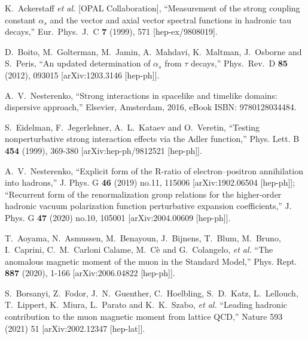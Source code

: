 \documentclass[aps,nofootinbib,showkeys,noshowpacs,preprintnumbers,amsmath,amssymb]{revtex4}
\begin{document}
\begin{thebibliography}{99}
  K.~Ackerstaff {\it et al.} [OPAL Collaboration],
  ``Measurement of the strong coupling constant $\alpha_s$ and the vector and axial vector spectral functions in hadronic tau decays,''
  Eur.\ Phys.\ J.\ C {\bf 7} (1999), 571
  [hep-ex/9808019].
 
  D.~Boito, M.~Golterman, M.~Jamin, A.~Mahdavi, K.~Maltman, J.~Osborne and S.~Peris,
  ``An updated determination of $\alpha_s$ from $\tau$ decays,''
  Phys.\ Rev.\ D {\bf 85} (2012), 093015
  [arXiv:1203.3146 [hep-ph]].

  A.~V.~Nesterenko,
  ``Strong interactions in spacelike and timelike domains: dispersive approach,'' Elsevier, Amsterdam, 2016, eBook ISBN: 9780128034484.

S.~Eidelman, F.~Jegerlehner, A.~L.~Kataev and O.~Veretin,
``Testing nonperturbative strong interaction effects via the Adler function,''
Phys. Lett. B \textbf{454} (1999), 369-380
[arXiv:hep-ph/9812521 [hep-ph]].

A.~V.~Nesterenko,
``Explicit form of the R-ratio of electron–positron annihilation into hadrons,''
J. Phys. G \textbf{46} (2019) no.11, 115006
[arXiv:1902.06504 [hep-ph]];
``Recurrent form of the renormalization group relations for the higher-order hadronic vacuum polarization function perturbative expansion coefficients,''
J. Phys. G \textbf{47} (2020) no.10, 105001
[arXiv:2004.00609 [hep-ph]].


T.~Aoyama, N.~Asmussen, M.~Benayoun, J.~Bijnens, T.~Blum, M.~Bruno, I.~Caprini, C.~M.~Carloni Calame, M.~C\`e and G.~Colangelo, \textit{et al.}
``The anomalous magnetic moment of the muon in the Standard Model,''
Phys. Rept. \textbf{887} (2020), 1-166
[arXiv:2006.04822 [hep-ph]].

S.~Borsanyi, Z.~Fodor, J.~N.~Guenther, C.~Hoelbling, S.~D.~Katz, L.~Lellouch, T.~Lippert, K.~Miura, L.~Parato and K.~K.~Szabo, \textit{et al.}
``Leading hadronic contribution to the muon magnetic moment from lattice QCD,''
Nature 593 (2021) 51
[arXiv:2002.12347 [hep-lat]].


\end{thebibliography}
\end{document}
